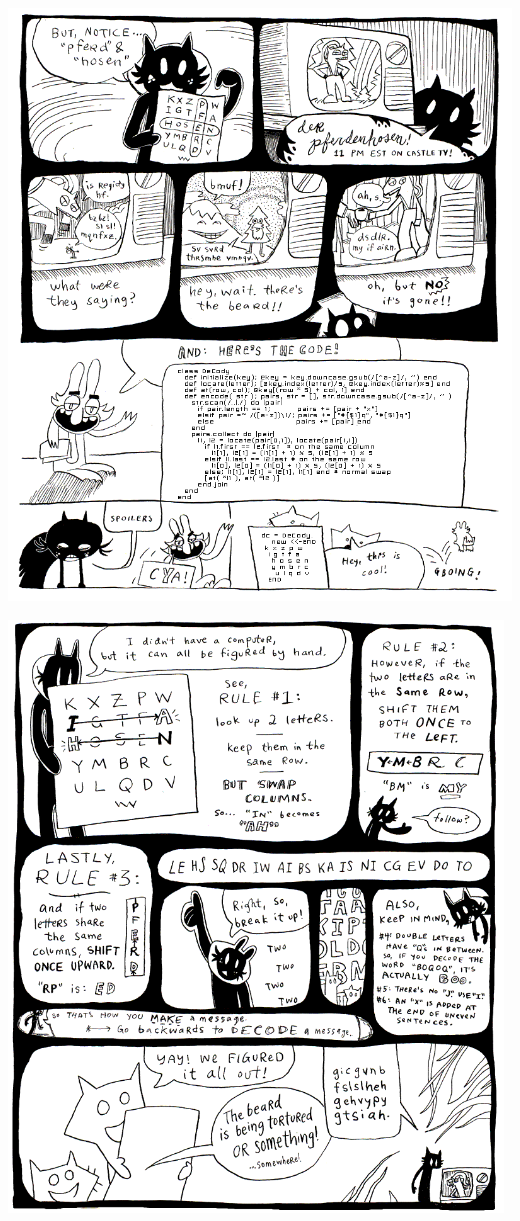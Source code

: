 \documentclass[10pt,twoside]{report}
\begin{document}
\vspace*{0.6cm} \includegraphics[width=1.0\textwidth]{cache/96.png}
\newpage

\vspace*{0.6cm}
\includegraphics[width=0.98375\textwidth]{cache/97.png}
\newpage
\end{document}

